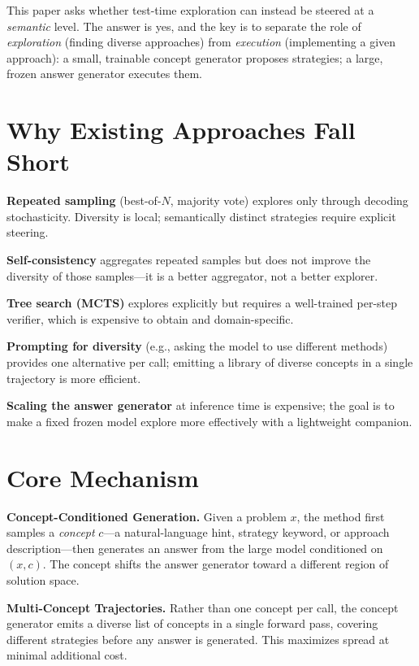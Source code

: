 \documentclass[10pt,twocolumn]{article}
\begin{document}
This paper asks whether test-time exploration can instead be steered at a
\emph{semantic} level. The answer is yes, and the key is to separate the role
of \emph{exploration} (finding diverse approaches) from \emph{execution}
(implementing a given approach): a small, trainable concept generator proposes
strategies; a large, frozen answer generator executes them.

\section{Why Existing Approaches Fall Short}

\textbf{Repeated sampling} (best-of-$N$, majority vote) explores only through
decoding stochasticity. Diversity is local; semantically distinct strategies
require explicit steering.

\textbf{Self-consistency} aggregates repeated samples but does not improve
the diversity of those samples---it is a better aggregator, not a better
explorer.

\textbf{Tree search (MCTS)} explores explicitly but requires a well-trained
per-step verifier, which is expensive to obtain and domain-specific.

\textbf{Prompting for diversity} (e.g., asking the model to use different
methods) provides one alternative per call; emitting a library of diverse
concepts in a single trajectory is more efficient.

\textbf{Scaling the answer generator} at inference time is expensive;
the goal is to make a fixed frozen model explore more effectively with a
lightweight companion.

\section{Core Mechanism}

\textbf{Concept-Conditioned Generation.} Given a problem $x$, the method
first samples a \emph{concept} $c$---a natural-language hint, strategy
keyword, or approach description---then generates an answer from the large
model conditioned on $(x, c)$. The concept shifts the answer generator
toward a different region of solution space.

\textbf{Multi-Concept Trajectories.} Rather than one concept per call, the
concept generator emits a diverse list of concepts in a single forward pass,
covering different strategies before any answer is generated. This maximizes
spread at minimal additional cost.
\end{document}
